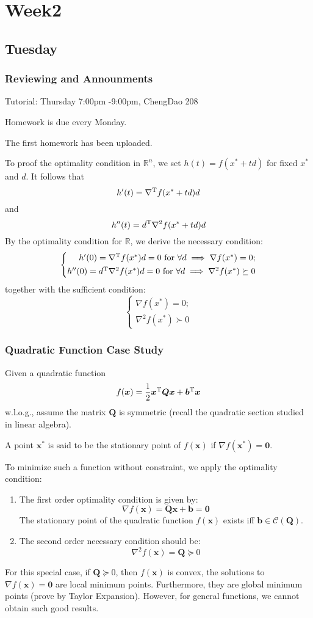 
\chapter{Week2}
\section{Tuesday}
\subsection{Reviewing and Announments}
Tutorial: Thursday 7:00pm -9:00pm, ChengDao 208

Homework is due every Monday.

The first homework has been uploaded.

To proof the optimality condition in $\mathbb{R}^n$, we set $h(t) = f(x^*+td)$ for fixed $x^*$ and $d$. It follows that
\[
h'(t)=\nabla^{\mathrm T} f(x^*+td)d
\]
and
\[
h''(t)=d^{\mathrm T}\nabla^2f(x^*+td)d
\]
By the optimality condition for $\mathbb{R}$, we derive the necessary condition:
\[
\left\{
\begin{aligned}
\mbox{$h'(0)=\nabla^{\mathrm T} f(x^*)d=0$ for $\forall d$}\implies \mbox{$\nabla f(x^*)=0$;}\\
\mbox{$h''(0)=d^{\mathrm T}\nabla^2f(x^*)d=0$ for $\forall d$}
\implies
\mbox{$\nabla^2f(x^*)\succeq0$}
\end{aligned}
\right.
\]
together with the sufficient condition:
\[
\left\{
\begin{aligned}
\mbox{$\nabla f(x^*)=0$;}\\
\mbox{$\nabla^2f(x^*)\succ0$}
\end{aligned}
\right.
\]
\subsection{Quadratic Function Case Study}
Given a quadratic function 
\[
f(\bm x) =\frac{1}{2}\bm x^{\mathrm T}\bm Q\bm x+\bm b^{\mathrm T}\bm x
\]
w.l.o.g., assume the matrix $\bm Q$ is symmetric (recall the quadratic section studied in linear algebra).


\begin{definition}[Stationarity]
A point $\bm x^*$ is said to be the stationary point of $f(\bm x)$ if $\nabla f(\bm x^*)=\bm0$.
\end{definition}
To minimize such a function without constraint, we apply the optimality condition:
\begin{enumerate}
\item
The first order optimality condition is given by:
\[
\nabla f(\bm x) = \bm Q\bm x+\bm b=\bm0
\]
The stationary point of the quadratic function $f(\bm x)$ exists iff $\bm b\in\mathcal{C}(\bm Q).$
\item
The second order necessary condition should be:
\[
\nabla^2 f(\bm x)=\bm Q\succeq0
\]
\end{enumerate}
For this special case, if $\bm Q\succeq0$, then $f(\bm x)$ is convex, the solutions to $\nabla f(\bm x) =\bm0$ are local minimum points. Furthermore, they are global minimum points (prove by Taylor Expansion). However, for general functions, we cannot obtain such good results.

